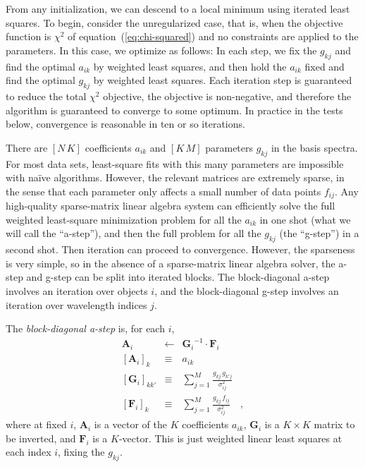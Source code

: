 \documentclass[12pt,preprint]{aastex}
\newcommand{\equationname}{equation}
\newcommand{\tv}[1]{\boldsymbol{#1}}
\newcommand{\inverse}[1]{{#1}^{-1}}
\begin{document}
From any initialization, we can descend to a local minimum using
iterated least squares.  To begin, consider the unregularized case,
that is, when the objective function is $\chi^2$ of
\equationname~(\ref{eq:chi-squared}) and no constraints are applied to
the parameters.  In this case, we optimize as follows: In each step,
we fix the $g_{kj}$ and find the optimal $a_{ik}$ by weighted least
squares, and then hold the $a_{ik}$ fixed and find the optimal
$g_{kj}$ by weighted least squares. Each iteration step is guaranteed
to reduce the total $\chi^2$ objective, the objective is non-negative,
and therefore the algorithm is guaranteed to converge to some optimum.
In practice in the tests below, convergence is reasonable in ten or so
iterations.

There are $[N\,K]$ coefficients $a_{ik}$ and $[K\,M]$ parameters
$g_{kj}$ in the basis spectra.  For most data sets, least-square fits
with this many parameters are impossible with na\"ive algorithms.
However, the relevant matrices are extremely sparse, in the sense that
each parameter only affects a small number of data points $f_{ij}$.
Any high-quality sparse-matrix linear algebra system can efficiently
solve the full weighted least-square minimization problem for all the
$a_{ik}$ in one shot (what we will call the ``a-step''), and then the
full problem for all the $g_{kj}$ (the ``g-step'') in a second shot.
Then iteration can proceed to convergence.  However, the sparseness is
very simple, so in the absence of a sparse-matrix linear algebra
solver, the a-step and g-step can be split into iterated blocks.  The
block-diagonal a-step involves an iteration over objects $i$, and the
block-diagonal g-step involves an iteration over wavelength indices
$j$.

The \emph{block-diagonal a-step} is, for each $i$,
\begin{eqnarray}\label{eq:astep}\displaystyle
\tv{A}_i & \gets & \inverse{\tv{G}_i}\cdot\tv{F}_i \nonumber\\
\left[\tv{A}_i\right]_k & \equiv & a_{ik} \nonumber\\
\left[\tv{G}_i\right]_{kk'} & \equiv & \sum_{j=1}^{M} \frac{g_{kj}\,g_{k'j}}{\sigma_{ij}^2} \nonumber\\
\left[\tv{F}_i\right]_k     & \equiv & \sum_{j=1}^{M} \frac{g_{kj}\,f_{i j}}{\sigma_{ij}^2}
\quad ,
\end{eqnarray}
where at fixed $i$, $\tv{A}_i$ is a vector of the $K$ coefficients
$a_{ik}$, $\tv{G}_i$ is a $K\times K$ matrix to be inverted, and
$\tv{F}_i$ is a $K$-vector.  This is just weighted linear least
squares at each index $i$, fixing the $g_{kj}$.
\end{document}
